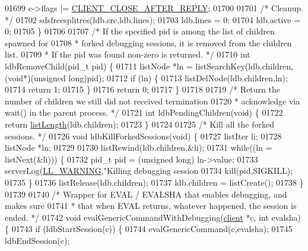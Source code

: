 \begin{DoxyCode}
{{{{{{{{{{{{{01699     c->flags |= \hyperlink{server_8h_a8cff2154afcc2e87ac85bdbbe2814091}{CLIENT\_CLOSE\_AFTER\_REPLY};
01700 
01701     \textcolor{comment}{/* Cleanup. */}
01702     sdsfreesplitres(ldb.src,ldb.lines);
01703     ldb.lines = 0;
01704     ldb.active = 0;
01705 \}
01706 
01707 \textcolor{comment}{/* If the specified pid is among the list of children spawned for}
01708 \textcolor{comment}{ * forked debugging sessions, it is removed from the children list.}
01709 \textcolor{comment}{ * If the pid was found non-zero is returned. */}
01710 \textcolor{keywordtype}{int} ldbRemoveChild(pid\_t pid) \{
01711     listNode *ln = listSearchKey(ldb.children,(\textcolor{keywordtype}{void}*)(\textcolor{keywordtype}{unsigned} \textcolor{keywordtype}{long})pid);
01712     \textcolor{keywordflow}{if} (ln) \{
01713         listDelNode(ldb.children,ln);
01714         \textcolor{keywordflow}{return} 1;
01715     \}
01716     \textcolor{keywordflow}{return} 0;
01717 \}
01718 
01719 \textcolor{comment}{/* Return the number of children we still did not received termination}
01720 \textcolor{comment}{ * acknowledge via wait() in the parent process. */}
01721 \textcolor{keywordtype}{int} ldbPendingChildren(\textcolor{keywordtype}{void}) \{
01722     \textcolor{keywordflow}{return} \hyperlink{adlist_8h_afde0ab079f934670e82119b43120e94b}{listLength}(ldb.children);
01723 \}
01724 
01725 \textcolor{comment}{/* Kill all the forked sessions. */}
01726 \textcolor{keywordtype}{void} ldbKillForkedSessions(\textcolor{keywordtype}{void}) \{
01727     listIter li;
01728     listNode *ln;
01729 
01730     listRewind(ldb.children,&li);
01731     \textcolor{keywordflow}{while}((ln = listNext(&li))) \{
01732         pid\_t pid = (\textcolor{keywordtype}{unsigned} \textcolor{keywordtype}{long}) ln->value;
01733         serverLog(\hyperlink{server_8h_a31229b9334bba7d6be2a72970967a14b}{LL\_WARNING},\textcolor{stringliteral}{"Killing debugging session %
01734         kill(pid,SIGKILL);
01735     \}
01736     listRelease(ldb.children);
01737     ldb.children = listCreate();
01738 \}
01739 
01740 \textcolor{comment}{/* Wrapper for EVAL / EVALSHA that enables debugging, and makes sure}
01741 \textcolor{comment}{ * that when EVAL returns, whatever happened, the session is ended. */}
01742 \textcolor{keywordtype}{void} evalGenericCommandWithDebugging(\hyperlink{structclient}{client} *c, \textcolor{keywordtype}{int} evalsha) \{
01743     \textcolor{keywordflow}{if} (ldbStartSession(c)) \{
01744         evalGenericCommand(c,evalsha);
01745         ldbEndSession(c);
}}}}}}}}}}}}}}
\end{DoxyCode}
